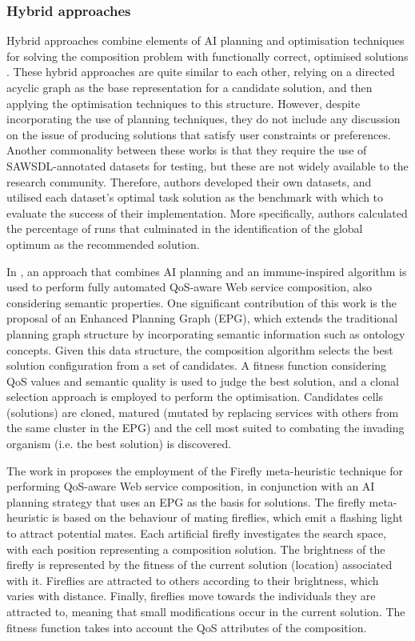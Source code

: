 \documentclass[conference]{IEEEtran}
\begin{document}
\subsubsection{Hybrid approaches}
Hybrid approaches combine elements of AI planning and optimisation techniques for solving the composition problem with functionally correct, optimised solutions \cite{pop2010immune,pop2011hybrid}. These hybrid approaches are quite similar to each other, relying on a directed acyclic graph as the base representation for a candidate solution, and then applying the optimisation techniques to this structure. However, despite incorporating the use of planning techniques, they do not include any discussion on the issue of producing solutions that satisfy user constraints or preferences. Another commonality between these works is that they require the use of SAWSDL-annotated datasets for testing, but these are not widely available to the research community. Therefore, authors developed their own datasets, and utilised each dataset's optimal task solution as the benchmark with which to evaluate the success of their implementation. More specifically, authors calculated the percentage of runs that culminated in the identification of the global optimum  as the recommended solution.

In \cite{pop2010immune}, an approach that combines AI planning and an immune-inspired algorithm is used to perform fully automated QoS-aware Web service composition, also considering
semantic properties. One significant contribution of this work is the proposal of an Enhanced Planning Graph (EPG), which extends the traditional planning graph structure
by incorporating semantic information such as ontology concepts. Given this data structure, the composition algorithm selects the best solution configuration from a set of candidates. A fitness function considering QoS values and semantic quality is used to judge the best solution, and a clonal selection approach is employed to perform the optimisation. Candidates cells (solutions) are cloned, matured (mutated by replacing services with others from the same cluster in the EPG) and the cell most suited to combating the invading organism (i.e. the best solution) is discovered.

The work in \cite{pop2011hybrid} proposes the employment of the Firefly meta-heuristic technique for performing QoS-aware Web service composition, in conjunction with an AI planning strategy that uses an EPG as the basis for solutions. The firefly meta-heuristic is based on the behaviour of mating fireflies, which emit a flashing light to attract potential mates. Each artificial firefly investigates the search space, with each position representing a composition solution. The brightness of the firefly is represented by the fitness of the current solution (location) associated with it. Fireflies are attracted to others according to their brightness, which varies with distance. Finally, fireflies move towards the individuals they are attracted to, meaning that small modifications occur in the current solution. The fitness function takes into account the QoS attributes of the composition.
\end{document}
